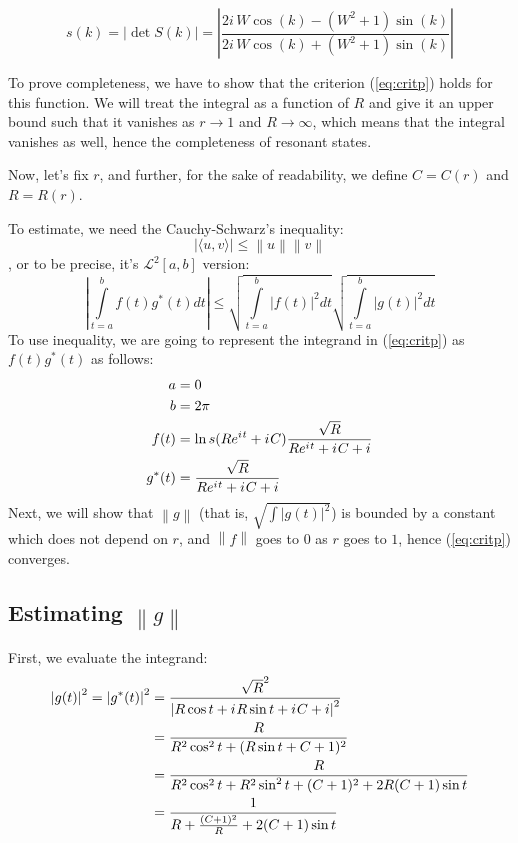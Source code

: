 \documentclass{gCOV2e}
\theoremstyle{plain}%
\theoremstyle{definition}
\theoremstyle{remark}
\newcommand{\iu}{{i\mkern1mu}} %
\newcommand{\eexp}[1]{e^{#1}}  %
\newcommand\abs[1]{\left|#1\right|}
\newcommand\norm[1]{\left\|#1\right\|}
\begin{document}
\begin{equation}\label{eq:bundle_s}
s(k) = \abs{\det S(k)} = \abs{\frac{2 i \, W \cos\left(k\right) - {\left(W^{2} + 1\right)} \sin\left(k\right)}{2 i \, W \cos\left(k\right) + {\left(W^{2} + 1\right)} \sin\left(k\right)}}
\end{equation}

To prove completeness, we have to show that the criterion (\ref{eq:critp}) holds for this function. We will treat the integral as a function of $R$ and give it an upper bound such that it vanishes as $r \to 1$ and $R \to \infty$, which means that the integral vanishes as well, hence the completeness of resonant states.

Now, let's fix $r$, and further, for the sake of readability, we define $C = C(r)$ and $R = R(r)$.

To estimate, we need the Cauchy-Schwarz's inequality:
\[
\big| \langle u,v \rangle \big| \leq \left\|u\right\| \left\|v\right\|
\]
, or to be precise, it's $\mathcal{L}^2[a, b]$ version:
\[
\abs{
\int\limits_{t=a}^{b} f(t) g^*(t) dt
}
\le
\sqrt{\int\limits_{t=a}^b \abs{f(t)}^2 dt }
\sqrt{\int\limits_{t=a}^b \abs{g(t)}^2 dt }
\]
% 
To use inequality, we are going to represent the integrand in (\ref{eq:critp}) as $f(t) g^*(t)$ as follows:
\begin{equation}\label{eq:split}
\begin{aligned}
a      &= 0 \\
b      &= 2 \pi \\
f(t)   &= \ln s(R \eexp{\iu t} + \iu C) \frac{\sqrt{R}}{R \eexp{\iu t} + \iu C + i} \\
g^*(t) &= \frac{\sqrt{R}}{R \eexp{\iu t} + \iu C + i}
\end{aligned}
\end{equation}
Next, we will show that $\norm{g}$ (that is, $\sqrt{\int \abs{g(t)}^2}$) is bounded by a constant which does not depend on $r$, and $\norm{f}$ goes to $0$ as $r$ goes to $1$, hence (\ref{eq:critp}) converges.

\subsection{Estimating $\norm{g}$}

First, we evaluate the integrand:
\begin{align*}
\abs{g(t)}^2 = \abs{g^*(t)}^2
&=   \frac{\sqrt{R}^2}{\abs{R \cos t + \iu R \sin t + \iu C + i}^2} \\
&=   \frac{R}{R^2 \cos^2 t + (R \sin t + C + 1)^2} \\
&= \frac{R}{R^2 \cos^2 t + R^2 \sin^2 t + (C + 1)^2  + 2 R (C + 1) \sin t} \\
&=   \frac{1}{R + \frac{(C + 1)^2}{R} + 2 (C + 1) \sin t} \\ 
\end{align*}
\end{document}
